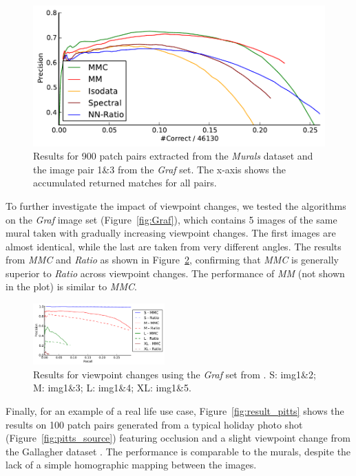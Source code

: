 \documentclass{article}
\begin{document}
\begin{figure}[htb]
	\centering
	\includegraphics[width=\columnwidth]{images/result_accumulated}
	\caption{Results for 900 patch pairs extracted from the \emph{Murals} dataset and the image pair 1\&3 from the \emph{Graf} set.  The x-axis shows the accumulated returned matches for all pairs.}
	\label{fig:result_accumulated}
\end{figure}

To further investigate the impact of viewpoint changes, we tested the 
algorithms on the \emph{Graf} image set (Figure~\ref{fig:Graf}), which 
contains 5 images of the same mural taken with gradually increasing 
viewpoint changes.  The first images are almost identical, while the 
last are taken from very different angles. The results from   \emph{MMC} 
and \emph{Ratio} as shown in Figure~\ref{fig:result_viewpoint}, 
confirming that \emph{MMC} is generally superior to \emph{Ratio} across 
viewpoint changes.
The performance of \emph{MM} (not shown in the plot) is similar to 
\emph{MMC}.

\begin{figure}[htb]
	\centering
	\includegraphics[width=0.45\textwidth]{images/result_viewpoint}
	\caption{Results for viewpoint changes using the \emph{Graf} set from 
		\cite{mikolajczyk2005performance}.  S: img1\&2; M: img1\&3; L: img1\&4; XL: img1\&5.}
	\label{fig:result_viewpoint}
\end{figure}


Finally, for an example of a real life use case, Figure~\ref{fig:result_pitts} 
shows the results on 100 patch pairs generated 
from a typical holiday photo shot (Figure~\ref{fig:pitts_source}) featuring occlusion and a slight viewpoint 
change from the Gallagher dataset \cite{gallagher2008}.  The performance is comparable to the murals, despite the lack of a simple homographic mapping between the images.
\end{document}
